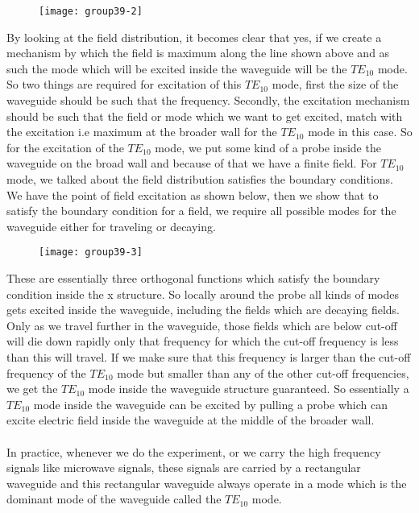 	 	\begin{figure}[h]
	 	\centering
	 	\texttt{[image: group39-2]}
	 	\caption{}
	 \end{figure}
	  By looking at the field distribution, it becomes clear that yes, if we create a mechanism by which the field is maximum along the line shown above and as such the mode which will be excited inside the waveguide will be the $TE_{10}$ mode. So two things are required for excitation of this $TE_{10}$ mode, first the size of the waveguide should be such that the frequency. Secondly, the excitation mechanism should be such that the field or mode which we want to get excited, match with the excitation i.e maximum at the broader wall for the $TE_{10}$ mode in this case. So for the excitation of the $TE_{10}$ mode, we put some kind of a probe inside the waveguide on the broad wall and because of that we have a finite field. For $TE_{10}$ mode, we talked about the field distribution satisfies the boundary conditions. We have the point of field excitation as shown below, then we show that to satisfy the boundary condition for a field, we require all possible modes for the waveguide either for traveling or decaying.
	  	\begin{figure}[h]
	  	\centering
	  	\texttt{[image: group39-3]}
	  	\caption{}
	  \end{figure}
	  These are essentially three orthogonal functions which satisfy the boundary condition inside the x structure. So locally around the probe all kinds of modes gets excited inside the waveguide, including the fields which are decaying fields. Only as we travel further in the waveguide, those fields which are below cut-off will die down rapidly only that frequency for which the cut-off frequency is less than this will travel. If we make sure that this frequency is larger than the cut-off frequency of the $TE_{10}$ mode but smaller than any of the other cut-off frequencies, we get the $TE_{10}$ mode inside the waveguide structure guaranteed. So essentially a $TE_{10}$ mode inside the waveguide can be excited by pulling a probe which can excite electric field inside the waveguide at the middle of the broader wall.
	  \paragraph{}In practice, whenever we do the experiment, or we carry the high frequency signals like microwave signals, these signals are carried by a rectangular waveguide and this rectangular waveguide always operate in  a mode which is the dominant mode of the waveguide called the $TE_{10}$ mode.
